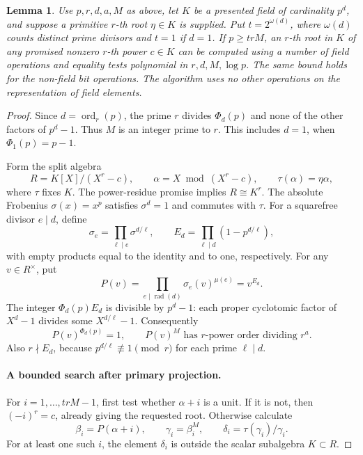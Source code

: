 \documentclass[11pt]{article}
\newtheorem{lemma}[theorem]{Lemma}
\theoremstyle{definition}
\theoremstyle{remark}
\begin{document}
\begin{lemma}\label{lem:projected-primary-root-extraction}
Use \(p,r,d,a,M\) as above, let \(K\) be a presented field
of cardinality \(p^d\), and suppose a primitive \(r\)-th
root \(\eta\in K\) is supplied. Put
\(t=2^{\omega(d)}\), where \(\omega(d)\) counts distinct
prime divisors and \(t=1\) if \(d=1\).
If \(p\geq trM\), an \(r\)-th root in \(K\) of any
promised nonzero \(r\)-th power \(c\in K\) can be computed
using a number of field operations and equality tests
polynomial in \(r,d,M,\log p\). The same bound holds for
the non-field bit operations. The algorithm uses no other
operations on the representation of field elements.
\end{lemma}
\begin{proof}
Since \(d=\operatorname{ord}_r(p)\), the prime \(r\) divides
\(\Phi_d(p)\) and none of the other factors of \(p^d-1\).
Thus \(M\) is an integer prime to \(r\). This includes
\(d=1\), when \(\Phi_1(p)=p-1\).

Form the split algebra
\[
 R=K[X]/(X^r-c),\qquad \alpha=X\bmod(X^r-c),
 \qquad \tau(\alpha)=\eta\alpha,
\]
where \(\tau\) fixes \(K\). The power-residue promise implies
\(R\cong K^r\). The absolute Frobenius \(\sigma(x)=x^p\)
satisfies \(\sigma^d=1\) and commutes with \(\tau\).
For a squarefree divisor \(e\mid d\), define
\[
 \sigma_e=\prod_{\ell\mid e}\sigma^{d/\ell},\qquad
 E_d=\prod_{\ell\mid d}(1-p^{d/\ell}),
\]
with empty products equal to the identity and to one,
respectively. For any \(v\in R^\times\), put
\[
 P(v)=\prod_{e\mid\operatorname{rad}(d)}
                          \sigma_e(v)^{\mu(e)}=v^{E_d}.
\]
The integer \(\Phi_d(p)E_d\) is divisible by \(p^d-1\):
each proper cyclotomic factor of \(X^d-1\) divides some
\(X^{d/\ell}-1\). Consequently
\begin{equation}\label{eq:cofactor-cyclotomic-projection}
 P(v)^{\Phi_d(p)}=1,
 \qquad P(v)^M\text{ has }r\text{-power order dividing }r^a.
\end{equation}
Also \(r\nmid E_d\), because \(p^{d/\ell}\not\equiv1\pmod r\)
for each prime \(\ell\mid d\).

\paragraph{A bounded search after primary projection.}
For \(i=1,\ldots,trM-1\), first test whether \(\alpha+i\)
is a unit. If it is not, then \((-i)^r=c\), already giving
the requested root. Otherwise calculate
\[
 \beta_i=P(\alpha+i),\qquad \gamma_i=\beta_i^M,
 \qquad \delta_i=\tau(\gamma_i)/\gamma_i.
\]
For at least one such \(i\), the element \(\delta_i\) is
outside the scalar subalgebra \(K\subset R\).


\end{proof}
\end{document}

